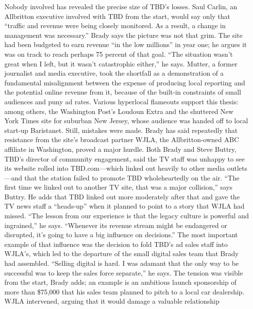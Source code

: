 Nobody involved has revealed the precise size of TBD's losses. Saul Carlin, an
Allbritton executive involved with TBD from the start, would say only that ``traffic
and revenue were being closely monitored. As a result, a change in management
was necessary.''
Brady says the picture was not that grim. The site had been budgeted to earn
revenue ``in the low millions'' in year one; he argues it was on track to reach perhaps
75 percent of that goal. ``The situation wasn't great when I left, but it wasn't
catastrophic either,'' he says.
Mutter, a former journalist and media executive, took the shortfall as a demonstration
of a fundamental misalignment between the expense of producing
local reporting and the potential online revenue from it, because of the built-in
constraints of small audiences and puny ad rates. Various hyperlocal flameouts
support this thesis: among others, the Washington Post's Loudoun Extra and the
shuttered New York Times site for suburban New Jersey, whose audience was
handed off to local start-up Baristanet.
Still, mistakes were made. Brady has said repeatedly that resistance from the
site's broadcast partner WJLA, the Allbritton-owned ABC affiliate in Washington,
proved a major hurdle. Both Brady and Steve Buttry, TBD's director of community
engagement, said the TV staff was unhappy to see its website rolled into
TBD.com—which linked out heavily to other media outlets—and that the station
failed to promote TBD wholeheartedly on the air.
``The first time we linked out to another TV site, that was a major collision,''
says Buttry. He adds that TBD linked out more moderately after that and gave the
TV news staff a ``heads-up'' when it planned to point to a story that WJLA had
missed. ``The lesson from our experience is that the legacy culture is powerful
and ingrained,'' he says. ``Whenever its revenue stream might be endangered or
disrupted, it's going to have a big influence on decisions.''
The most important example of that influence was the decision to fold TBD's
ad sales staff into WJLA's, which led to the departure of the small digital sales
team that Brady had assembled. ``Selling digital is hard. I was adamant that the
only way to be successful was to keep the sales force separate,'' he says. The tension
was visible from the start, Brady adds; an example is an ambitious launch
sponsorship of more than \$75,000 that his sales team planned to pitch to a local
car dealership. WJLA intervened, arguing that it would damage a valuable relationship

